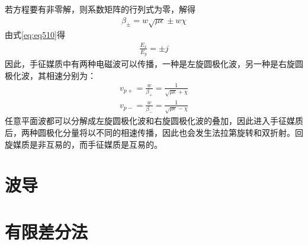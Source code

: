 \documentclass{article}
\numberwithin{equation}{section}
\begin{document}
若方程要有非零解，则系数矩阵的行列式为零，解得
\begin{align}
    \label{eq:eq511}
    \beta_{\pm}=w\sqrt{\mu\epsilon}\pm w\chi
\end{align}
由式\ref{eq:eq510}得
\begin{align}
    \label{eq:eq512}
    \frac{E_x}{E_y}=\pm j
\end{align}
因此，手征媒质中有两种电磁波可以传播，一种是左旋圆极化波，另一种是右旋圆极化波，其相速分别为：
\begin{align}
    \label{eq:eq513}
    v_{p+}=\frac{w}{\beta_+}=\frac{1}{\sqrt{\mu\epsilon}+\chi} \\
    \label{eq:eq514}
    v_{p-}=\frac{w}{\beta_-}=\frac{1}{\sqrt{\mu\epsilon}-\chi}
\end{align}
任意平面波都可以分解成左旋圆极化波和右旋圆极化波的叠加，因此进入手征媒质后，两种圆极化分量将以不同的相速传播，因此也会发生法拉第旋转和双折射。回旋媒质是非互易的，而手征媒质是互易的。
\section{波导}
\newpage
\section{有限差分法}
\end{document}
